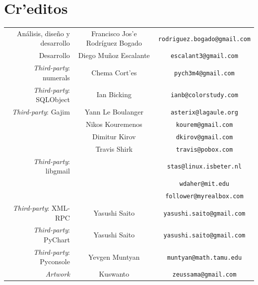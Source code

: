 \documentclass[a4paper]{article}
\begin{document}
    \section{Cr'editos}
        \begin{center}
        \begin{tabular}{r@{:} c @{(}c@{)}}
            Análisis, diseño y desarrollo & Francisco Jos'e Rodríguez Bogado & \texttt{rodriguez.bogado@gmail.com} \\
            Desarrollo                    & Diego Muñoz Escalante            & \texttt{escalant3@gmail.com} \\
            \emph{Third-party}: numerals  & Chema Cort'es                    & \texttt{pych3m4@gmail.com} \\
            \emph{Third-party}: SQLObject & Ian Bicking                      & \texttt{ianb@colorstudy.com} \\
            \emph{Third-party}: Gajim     & Yann Le Boulanger                & \texttt{asterix@lagaule.org} \\
                                          & Nikos Kouremenos                 & \texttt{kourem@gmail.com} \\
                                          & Dimitur Kirov                    & \texttt{dkirov@gmail.com} \\
                                          & Travis Shirk                     & \texttt{travis@pobox.com} \\
            \emph{Third-party}: libgmail  &                                  & \texttt{stas@linux.isbeter.nl} \\
                                          &                                  & \texttt{wdaher@mit.edu} \\
                                          &                                  & \texttt{follower@myrealbox.com} \\
            \emph{Third-party}: XML-RPC   & Yasushi Saito                    & \texttt{yasushi.saito@gmail.com} \\
            \emph{Third-party}: PyChart   & Yasushi Saito                    & \texttt{yasushi.saito@gmail.com} \\
            \emph{Third-party}: Pyconsole & Yevgen Muntyan                   & \texttt{muntyan@math.tamu.edu} \\
            \emph{Artwork}                & Kuswanto                         & \texttt{zeussama@gmail.com} \\
        \end{tabular}
        \end{center}
\end{document}
